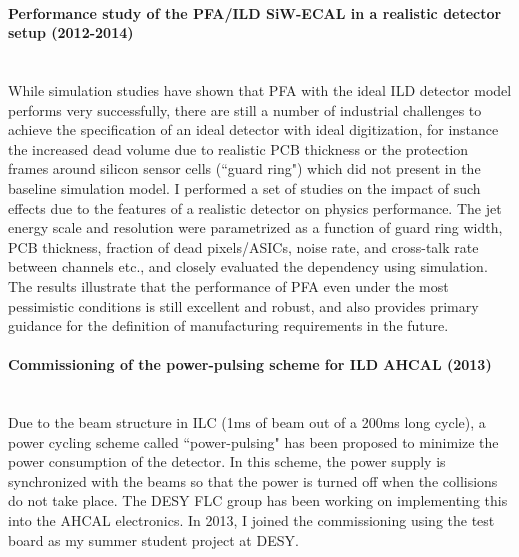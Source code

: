 \documentclass[12pt]{article}
\newcommand{\Subsubsection}[1]{\subsubsection*{#1}
\addcontentsline{toc}{subsubsection}{#1}}
\begin{document}
\paragraph{Performance study of the PFA/ILD SiW-ECAL in a realistic detector setup   (2012-2014)}  \phantom{k} \vspace{3mm} \\
While simulation studies have shown that PFA with the ideal ILD detector model performs very successfully, 
there are still a number of industrial challenges to achieve the specification of an ideal detector with ideal digitization, 
for instance the increased dead volume due to realistic PCB thickness or the protection frames around silicon sensor cells (``guard ring") which did not present in the baseline simulation model.
I performed a set of studies on the impact of such effects due to the features of a realistic detector on physics performance. 
The jet energy scale and resolution were parametrized as a function of guard ring width,
PCB thickness, fraction of dead pixels/ASICs, noise rate, and cross-talk rate between channels etc., 
and closely evaluated the dependency using simulation. 
The results illustrate that the performance of PFA even under the most pessimistic conditions is still excellent and robust, %
and also provides primary guidance for the definition of manufacturing requirements in the future. 

\paragraph{Commissioning of the power-pulsing scheme for ILD AHCAL (2013)}  \phantom{k} \vspace{3mm} \\
Due to the beam structure in ILC (1ms of beam out of a 200ms long cycle), 
a power cycling scheme called ``power-pulsing" has been proposed to minimize the power consumption of the detector. 
In this scheme, the power supply is synchronized with the beams so that the power is turned off when the collisions do not take place. 
The DESY FLC group has been working on implementing this into the AHCAL electronics. 
In 2013, I joined the commissioning using the test board as my summer student project at DESY. \\
\end{document}
